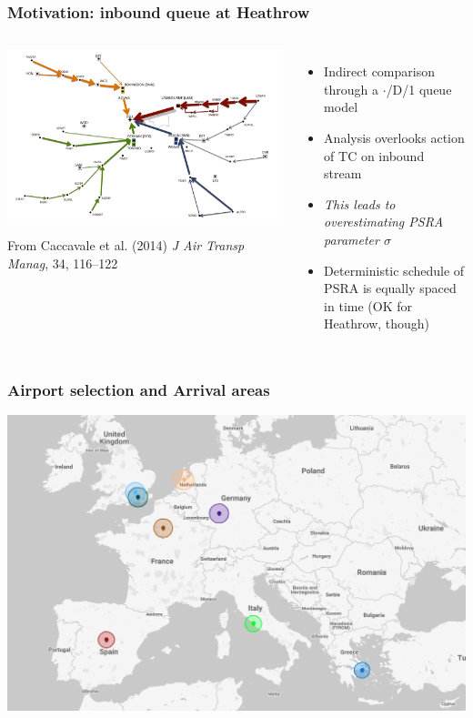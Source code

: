 \documentclass[table,aspectratio=169]{beamer}
\begin{document}

\begin{frame}[t]\frametitle{Motivation: inbound queue at Heathrow}
    \begin{columns}
        \begin{center}
            \includegraphics[width=.85\textwidth]{cills2}

            {\tiny From Caccavale et al. (2014) \emph{J Air Transp Manag}, 34, 116--122}
        \end{center}
        \begin{itemize}
            \item Indirect comparison through a \alert{$\cdot$/D/1 queue model}
            \item Analysis overlooks action of TC on inbound stream
            \item \emph{This leads to overestimating PSRA parameter $\sigma$}
            \item Deterministic schedule of PSRA is equally spaced in time (OK for Heathrow, though)
        \end{itemize}
    \end{columns}
\end{frame}

\begin{frame}[t]\frametitle{Airport selection and Arrival areas}
    \centering
    \includegraphics[width=.7\textwidth]{map}
\end{frame}
\end{document}
